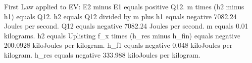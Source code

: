 First Law applied to EV:
E2 minus E1 equals positive Q12.
m times (h2 minus h1) equals Q12.
h2 equals Q12 divided by m plus h1 equals negative 7082.24 Joules per second.
Q12 equals negative 7082.24 Joules per second.
m equals 0.01 kilograms.
h2 equals Uplisting f_x times (h_res minus h_fin) equals negative 200.0928 kiloJoules per kilogram.
h_f1 equals negative 0.048 kiloJoules per kilogram.
h_res equals negative 333.988 kiloJoules per kilogram.